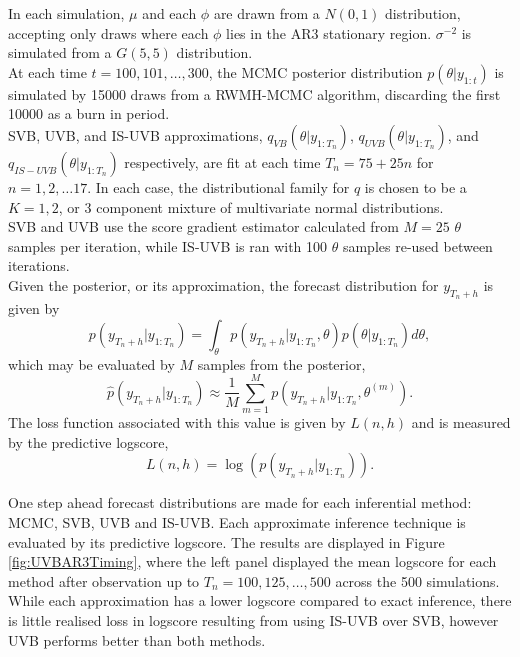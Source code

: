 \documentclass[12pt,a4paper]{article}\usepackage[]{graphicx}\usepackage[]{color}
\begin{document}
In each simulation, $\mu$ and each $\phi$ are drawn from a $N(0, 1)$ distribution, accepting only draws where each $\phi$ lies in the AR3 stationary region. $\sigma^{-2}$ is simulated from a $G(5, 5)$ distribution.
\\

At each time $t = 100, 101, \ldots, 300$, the MCMC posterior distribution $p(\theta | y_{1:t})$ is simulated by 15000 draws from a RWMH-MCMC algorithm, discarding the first 10000 as a burn in period.
\\

SVB, UVB, and IS-UVB approximations, $q_{VB}(\theta | y_{1:T_n})$, $q_{UVB}(\theta | y_{1:T_n})$, and $q_{IS-UVB}(\theta | y_{1:T_n})$ respectively, are fit at each time $T_n = 75 + 25n$ for $n = 1, 2, \ldots 17$. In each case, the distributional family for $q$ is chosen to be a $K = 1, 2$, or $3$ component mixture of multivariate normal distributions.
\\

SVB and UVB use the score gradient estimator calculated from $M = 25$ $\theta$ samples per iteration, while IS-UVB is ran with 100 $\theta$ samples re-used between iterations.
\\

Given the posterior, or its approximation, the forecast distribution for $y_{T_n+h}$ is given by
\begin{equation}
\label{UVB:TSforecastDist}
p(y_{T_n + h} | y_{1:T_n}) = \int_{\theta} p(y_{T_n + h} | y_{1:T_n}, \theta)p(\theta | y_{1:T_n})d\theta,
\end{equation}
which may be evaluated by $M$ samples from the posterior,
\begin{equation}
\label{UVB:TSforecastDistApprox}
\hat{p}(y_{T_n + h} | y_{1:T_n}) \approx \frac{1}{M} \sum_{m=1}^M  p(y_{T_n + h} | y_{1:T_n}, \theta^{(m)}).
\end{equation}
The loss function associated with this value is given by $L(n, h)$ and is measured by the predictive logscore,
\begin{equation}
\label{UVB:TSlogscore}
L(n, h) = \log(p(y_{T_n + h} | y_{1:T_n})).
\end{equation}

One step ahead forecast distributions are made for each inferential method: MCMC, SVB, UVB and IS-UVB. Each approximate inference technique is evaluated by its predictive logscore. The results are displayed in Figure \ref{fig:UVBAR3Timing}, where the left panel displayed the mean logscore for each method after observation up to $T_n = 100, 125, \ldots, 500$ across the 500 simulations. While each approximation has a lower logscore compared to exact inference, there is little realised loss in logscore resulting from using IS-UVB over SVB, however UVB performs better than both methods.
\\
\end{document}
